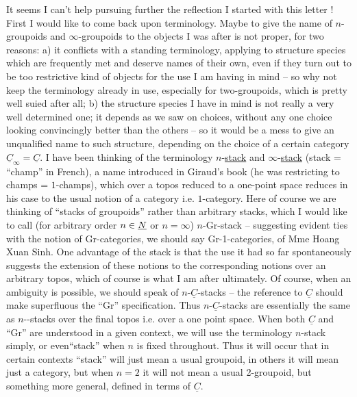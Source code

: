  It seems I can't help pursuing further the reflection I started with this letter ! First I would like to come back upon terminology. Maybe to give the name of $n$-groupoids and $\infty$-groupoids to the objects I was after is not proper, for two reasons: a) it conflicts with a standing terminology, applying to structure species which are frequently met and deserve names of their own, even if they turn out to be too restrictive kind of objects for the use I am having in mind -- so why not keep the terminology already in use, especially for two-groupoids, which is pretty well suied after all; b) the structure species I have in mind is not really a very well determined one; it depends as we saw on choices, without any one choice looking convincingly better than the others -- so it would be a mess to give an unqualified name to such structure, depending on the choice of a certain category $\underline{C}_{\infty}=\underline{C}$. I have been thinking of the terminology $n$-\uline{stack} and $\infty$-\uline{stack} (stack = ``champ'' in French), a name introduced in Giraud's book (he was restricting to champs = $1$-champs), which over a topos reduced to a one-point space reduces in his case to the usual notion of a category i.e. $1$-category. Here of course we are thinking of ``stacks of groupoids'' rather than arbitrary stacks, which I would like to call (for arbitrary order $n\in\underline{N}$ or $n=\infty$) $n$-Gr-stack -- suggesting evident ties with the notion of Gr-categories, we should say Gr-1-categories, of Mme Hoang Xuan Sinh. One advantage of the  stack is that the use it had so far spontaneously suggests the extension of these notions to the corresponding notions over an arbitrary topos, which of course is what I am after ultimately. Of course, when an ambiguity is possible, we should speak of  $n$-$\underline{C}$-stacks -- the reference to $\underline{C}$ should make superfluous the ``Gr'' specification. Thus $n$-$\underline{C}$-stacks are essentially the same as $n$--stacks over the final topos i.e. over a one point space. When both $\underline{C}$ and ``Gr'' are understood in a given context, we will use the  terminology $n$-stack simply, or even``stack'' when $n$ is fixed throughout. Thus it will occur that in certain contexts ``stack'' will just mean a usual groupoid,  in others it will mean just a category,  but when $n=2$ it will not mean a usual 2-groupoid, but something more general, defined in terms of $\underline{C}$.

